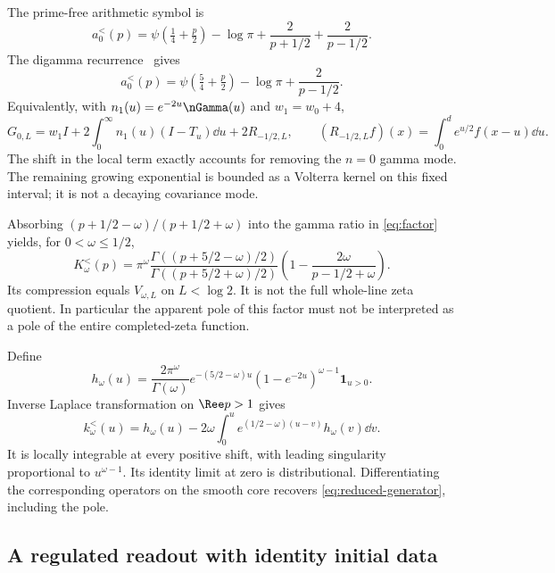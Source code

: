 The prime-free arithmetic symbol is
\[
 a_0^{<}(p)=\psi\left(\tfrac14+\tfrac p2\right)-\log\pi
                +\frac2{p+1/2}+\frac2{p-1/2}.
\]
The digamma recurrence~\cite[Section~5.5]{DLMFGamma} gives
\begin{equation}\label{eq:absorbed-symbol}
 a_0^{<}(p)=\psi\left(\tfrac54+\tfrac p2\right)-\log\pi
                          +\frac2{p-1/2}.
\end{equation}
Equivalently, with $n_1(u)=e^{-2u}\nGamma(u)$ and $w_1=w_0+4$,
\begin{equation}\label{eq:reduced-generator}
 G_{0,L}=w_1I+
 2\int_0^\infty n_1(u)(I-T_u)\dd u+2R_{-1/2,L},
 \qquad
 (R_{-1/2,L}f)(x)=\int_0^d e^{u/2}f(x-u)\dd u.
\end{equation}
The shift in the local term exactly accounts for removing the
$n=0$ gamma mode. The remaining growing exponential is bounded
as a Volterra kernel on this fixed interval; it is not a
decaying covariance mode.

Absorbing $(p+1/2-\omega)/(p+1/2+\omega)$ into the gamma ratio
in \eqref{eq:factor} yields, for $0<\omega\le1/2$,
\begin{equation}\label{eq:small-transfer-factor}
 K_\omega^{<}(p)=\pi^\omega
 \frac{\Gamma((p+5/2-\omega)/2)}
      {\Gamma((p+5/2+\omega)/2)}
 \left(1-\frac{2\omega}{p-1/2+\omega}\right).
\end{equation}
Its compression equals $V_{\omega,L}$ on $L<\log2$.
It is not the full whole-line zeta quotient. In particular the
apparent pole of this factor must not be interpreted as a pole
of the entire completed-zeta function.

Define
\begin{equation}\label{eq:reduced-beta}
 h_\omega(u)=\frac{2\pi^\omega}{\Gamma(\omega)}
 e^{-(5/2-\omega)u}(1-e^{-2u})^{\omega-1}\mathbf1_{u>0}.
\end{equation}
Inverse Laplace transformation on $\Ree p>1$ gives
\begin{equation}\label{eq:small-transfer-kernel}
 k_\omega^{<}(u)=h_\omega(u)-
 2\omega\int_0^u e^{(1/2-\omega)(u-v)}h_\omega(v)\dd v.
\end{equation}
It is locally integrable at every positive shift, with leading
singularity proportional to $u^{\omega-1}$. Its identity limit
at zero is distributional. Differentiating the corresponding
operators on the smooth core recovers
\eqref{eq:reduced-generator}, including the pole.

\subsection{A regulated readout with identity initial data}
\label{subsec:readout-model}

